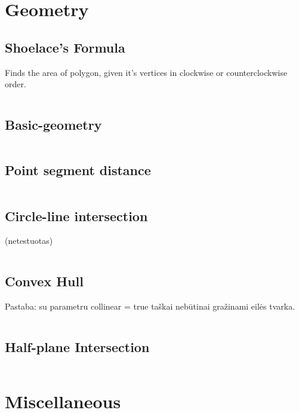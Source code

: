 \documentclass[8pt,a4paper,landscape,oneside]{amsart}
\newcommand{\code}[1]{\inputminted[fontsize=\normalsize,baselinestretch=1]{cpp}{_code/#1}}
\begin{document}
\begin{multicols*}{3}
	\code{math/lagrande_interpolation.cpp}
	
\section{Geometry}

	\subsection{Shoelace's Formula}
	
	Finds the area of polygon, given it's vertices in clockwise or counterclockwise order.
	
	\code{geometry/shoelace.cpp}

	\subsection{Basic-geometry}
	
	\code{geometry/basic_geometry.cpp}
	
	\subsection{Point segment distance}
	
	\code{geometry/point_segment_distance.cpp}
	
	\subsection{Circle-line intersection}
	
	(netestuotas)
	
	\code{geometry/circle_line_intersection.cpp}
	
	\subsection{Convex Hull}
	
	Pastaba: su parametru collinear = true taškai nebūtinai gražinami eilės tvarka.
	
	\code{geometry/convex_hull.cpp}

	\subsection{Half-plane Intersection}
	
	\code{geometry/half_plane_intersection.cpp}
	
\section{Miscellaneous}


\end{multicols*}
\end{document}
